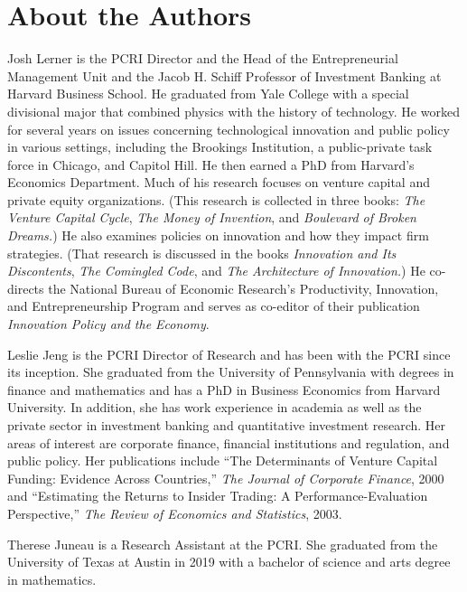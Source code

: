 \documentclass[
]{book}
\begin{document}
\hypertarget{about-the-authors-3}{%
\section*{About the Authors}\label{about-the-authors-3}}

Josh Lerner is the PCRI Director and the Head of the Entrepreneurial Management Unit and the Jacob H. Schiff Professor of Investment Banking at Harvard Business School. He graduated from Yale College with a special divisional major that combined physics with the history of technology. He worked for several years on issues concerning technological innovation and public policy in various settings, including the Brookings Institution, a public-private task force in Chicago, and Capitol Hill. He then earned a PhD from Harvard's Economics Department. Much of his research focuses on venture capital and private equity organizations. (This research is collected in three books: \emph{The Venture Capital Cycle}, \emph{The Money of Invention}, and \emph{Boulevard of Broken Dreams.}) He also examines policies on innovation and how they impact firm strategies. (That research is discussed in the books \emph{Innovation and Its Discontents}, \emph{The Comingled Code}, and \emph{The Architecture of Innovation.}) He co-directs the National Bureau of Economic Research's Productivity, Innovation, and Entrepreneurship Program and serves as co-editor of their publication \emph{Innovation Policy and the Economy}.

Leslie Jeng is the PCRI Director of Research and has been with the PCRI since its inception. She graduated from the University of Pennsylvania with degrees in finance and mathematics and has a PhD in Business Economics from Harvard University. In addition, she has work experience in academia as well as the private sector in investment banking and quantitative investment research. Her areas of interest are corporate finance, financial institutions and regulation, and public policy. Her publications include ``The Determinants of Venture Capital Funding: Evidence Across Countries,'' \emph{The Journal of Corporate Finance}, 2000 and ``Estimating the Returns to Insider Trading: A Performance-Evaluation Perspective,'' \emph{The Review of Economics and Statistics}, 2003.

Therese Juneau is a Research Assistant at the PCRI. She graduated from the University of Texas at Austin in 2019 with a bachelor of science and arts degree in mathematics.
\end{document}
